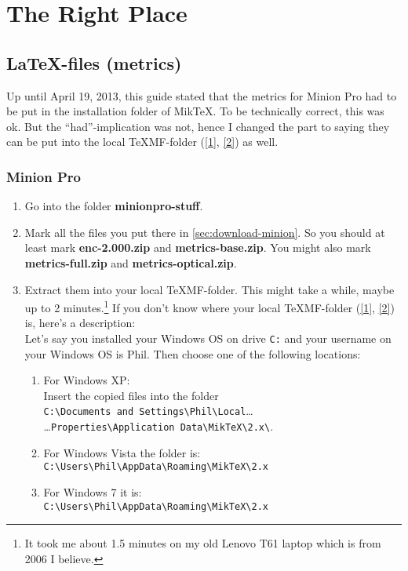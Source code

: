\section{The Right Place}

\subsection{LaTeX-files (metrics)}

Up until April 19, 2013, this guide stated that the metrics for Minion Pro had to be put in the installation folder of MikTeX. To be technically correct, this was ok. But the ``had''-implication was not, hence I changed the part to saying they can be put into the local {\TeX}MF-folder (\href{http://en.wikipedia.org/wiki/TeX_Directory_Structure}{[1]}, \href{http://www.ctan.org/tex-archive/tds}{[2]}) as well.

\subsubsection{Minion Pro}

\begin{enumerate}
	\item Go into the folder \textbf{minionpro-stuff}.
	\item Mark all the files you put there in \autoref{sec:download-minion}. So you should at least mark \textbf{enc-2.000.zip} and \textbf{metrics-base.zip}. You might also mark \textbf{metrics-full.zip} and \textbf{metrics-optical.zip}.
	\item Extract them into your local {\TeX}MF-folder. This might take a while, maybe up to 2 minutes.\footnote{It took me about 1.5 minutes on my old Lenovo T61 laptop which is from 2006 I believe.} If you don't know where your local {\TeX}MF-folder (\href{http://en.wikipedia.org/wiki/TeX_Directory_Structure}{[1]}, \href{http://www.ctan.org/tex-archive/tds}{[2]}) is, here's a description:\\
	Let's say you installed your Windows OS on drive \verb+C:+ and your username on your Windows OS is Phil. Then choose one of the following locations:
	\begin{enumerate}
		\item For Windows XP:\\
		Insert the copied files into the folder\\
			\verb+C:\Documents and Settings\Phil\Local+\ldots\\
		\ldots \verb+Properties\Application Data\MikTeX\2.x\+.
		\item \normalsize For Windows Vista the folder is:\\
		\verb+C:\Users\Phil\AppData\Roaming\MikTeX\2.x+
		\item For Windows 7 it is:\\
		\verb+C:\Users\Phil\AppData\Roaming\MikTeX\2.x+
	\end{enumerate}
\end{enumerate}

